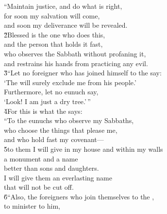 \begin{poetry}
\poemll    ``Maintain justice, and do what is right, \\
\poeml for soon my salvation will come, \\
\poemll    and soon my deliverance will be revealed. \\
\poeml \v{2}Blessed is the one who does this, \\
\poemll    and the person that holds it fast, \\
\poeml who observes the Sabbath without profaning it, \\
\poemll    and restrains his hands from practicing any evil. \\
\poeml \v{3}``Let no foreigner who has joined himself to the  say: \\
\poemll    `The  will surely exclude me from his people.' \\
\poeml Furthermore, let no eunuch say, \\
\poemll    `Look! I am just a dry tree.'\,'' \\
\poeml \v{4}For this is what the  says: \\
\poeml ``To the eunuchs who observe my Sabbaths, \\
\poemll    who choose the things that please me, \\
\poemlll       and who hold fast my covenant--- \\
\poeml \v{5}to them I will give in my house and within my walls \\
\poemll    a monument and a name \\
\poemlll       better than sons and daughters. \\
\poeml I will give them an everlasting name \\
\poemll    that will not be cut off. \\
\poeml \v{6}``Also, the foreigners who join themselves to the , \\
\poemll    to minister to him, \\

\end{poetry}
